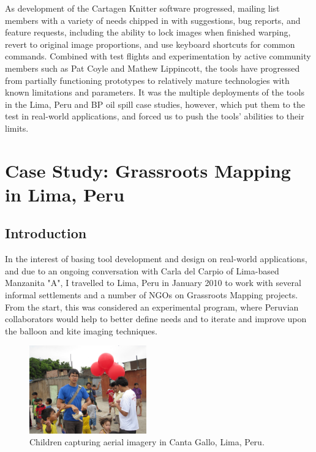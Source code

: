 \documentclass[11pt,oneside,notitlepage]{report}
\begin{document}
As development of the Cartagen Knitter software progressed, mailing list members with a variety of needs chipped in with suggestions, bug reports, and feature requests, including the ability to lock images when finished warping, revert to original image proportions, and use keyboard shortcuts for common commands. Combined with test flights and experimentation by active community members such as Pat Coyle and Mathew Lippincott, the tools have progressed from partially functioning prototypes to relatively mature technologies with known limitations and parameters. It was the multiple deployments of the tools in the Lima, Peru and BP oil spill case studies, however, which put them to the test in real-world applications, and forced us to push the tools' abilities to their limits. 

\chapter{Case Study: Grassroots Mapping in Lima, Peru}
\label{chap:peru}

\section{Introduction}

In the interest of basing tool development and design on real-world applications, and due to an ongoing conversation with Carla del Carpio of Lima-based Manzanita "A", I travelled to Lima, Peru in January 2010 to work with several informal settlements and a number of NGOs on Grassroots Mapping projects. From the start, this was considered an experimental program, where Peruvian collaborators would help to better define needs and to iterate and improve upon the balloon and kite imaging techniques.

\begin{figure}
	\begin{flushright}
		\includegraphics[width=0.45\textwidth]{images/kids-canta-gallo.jpg}
		\caption{Children capturing aerial imagery in Canta Gallo, Lima, Peru.}
	\end{flushright}
\end{figure}
\end{document}
